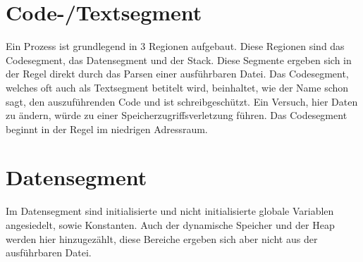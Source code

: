 \documentclass[12pt]{book}
\begin{document}
\section{Code-/Textsegment}
Ein Prozess ist grundlegend in 3 Regionen aufgebaut. Diese Regionen sind das
Codesegment, das Datensegment und der Stack. Diese Segmente ergeben sich in der
Regel direkt durch das Parsen einer ausführbaren Datei. Das Codesegment, welches
oft auch als Textsegment betitelt wird, beinhaltet, wie der Name schon sagt, den
auszuführenden Code und ist schreibgeschützt. Ein Versuch, hier Daten zu ändern,
würde zu einer Speicherzugriffsverletzung führen. Das Codesegment beginnt in der
Regel im niedrigen Adressraum.


\section{Datensegment}
Im Datensegment sind initialisierte und nicht initialisierte globale Variablen
angesiedelt, sowie Konstanten. Auch der dynamische Speicher und der Heap werden
hier hinzugezählt, diese Bereiche ergeben sich aber nicht aus der ausführbaren
Datei.
\end{document}
